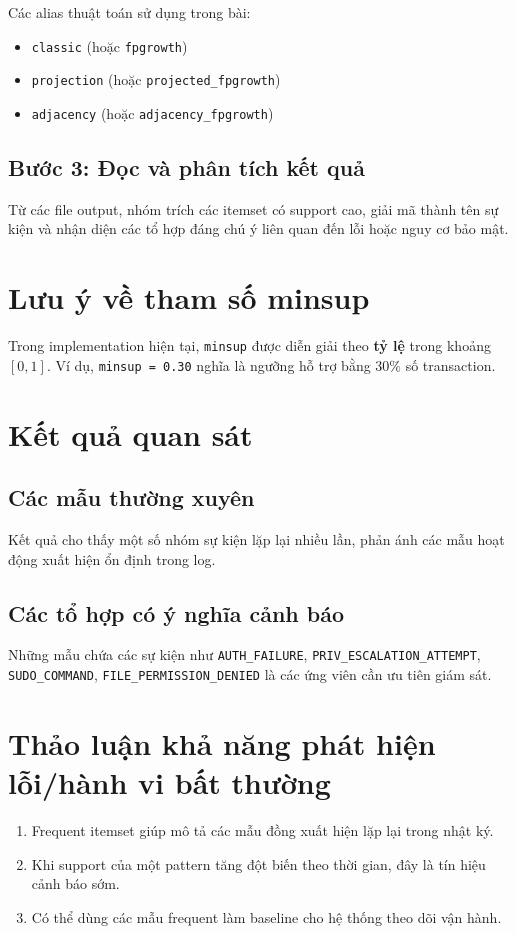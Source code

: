 \documentclass[12pt,a4paper]{article}
\begin{document}
\noindent Các alias thuật toán sử dụng trong bài:
\begin{itemize}[leftmargin=1.5em]
    \item \texttt{classic} (hoặc \texttt{fpgrowth})
    \item \texttt{projection} (hoặc \texttt{projected\_fpgrowth})
    \item \texttt{adjacency} (hoặc \texttt{adjacency\_fpgrowth})
\end{itemize}

\subsection{Bước 3: Đọc và phân tích kết quả}
Từ các file output, nhóm trích các itemset có support cao, giải mã thành tên sự kiện và nhận diện các tổ hợp đáng chú ý liên quan đến lỗi hoặc nguy cơ bảo mật.

\section{Lưu ý về tham số minsup}
Trong implementation hiện tại, \texttt{minsup} được diễn giải theo \textbf{tỷ lệ} trong khoảng $[0,1]$. Ví dụ, \texttt{minsup = 0.30} nghĩa là ngưỡng hỗ trợ bằng $30\%$ số transaction.

\section{Kết quả quan sát}
\subsection{Các mẫu thường xuyên}
Kết quả cho thấy một số nhóm sự kiện lặp lại nhiều lần, phản ánh các mẫu hoạt động xuất hiện ổn định trong log.

\subsection{Các tổ hợp có ý nghĩa cảnh báo}
Những mẫu chứa các sự kiện như \texttt{AUTH\_FAILURE}, \texttt{PRIV\_ESCALATION\_ATTEMPT}, \texttt{SUDO\_COMMAND}, \texttt{FILE\_PERMISSION\_DENIED} là các ứng viên cần ưu tiên giám sát.

\section{Thảo luận khả năng phát hiện lỗi/hành vi bất thường}
\begin{enumerate}[leftmargin=1.5em]
    \item Frequent itemset giúp mô tả các mẫu đồng xuất hiện lặp lại trong nhật ký.
    \item Khi support của một pattern tăng đột biến theo thời gian, đây là tín hiệu cảnh báo sớm.
    \item Có thể dùng các mẫu frequent làm baseline cho hệ thống theo dõi vận hành.
\end{enumerate}
\end{document}
